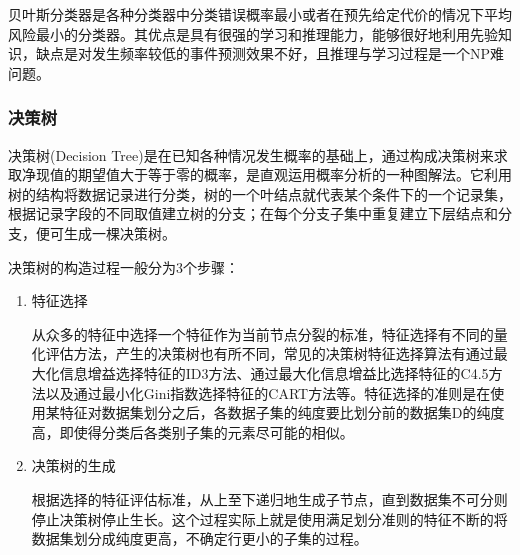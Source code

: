 \documentclass[a4paper]{ctexart}
\begin{document}
贝叶斯分类器是各种分类器中分类错误概率最小或者在预先给定代价的情况下平均风险最小的分类器。其优点是具有很强的学习和推理能力，能够很好地利用先验知识，缺点是对发生频率较低的事件预测效果不好，且推理与学习过程是一个NP难问题。

\subsubsection{决策树}
决策树(Decision Tree)是在已知各种情况发生概率的基础上，通过构成决策树来求取净现值的期望值大于等于零的概率，是直观运用概率分析的一种图解法。它利用树的结构将数据记录进行分类，树的一个叶结点就代表某个条件下的一个记录集，根据记录字段的不同取值建立树的分支；在每个分支子集中重复建立下层结点和分支，便可生成一棵决策树\cite{RN195}。

决策树的构造过程一般分为3个步骤：
\begin{enumerate}
	\item 特征选择

	      从众多的特征中选择一个特征作为当前节点分裂的标准，特征选择有不同的量化评估方法，产生的决策树也有所不同，常见的决策树特征选择算法有通过最大化信息增益选择特征的ID3方法\cite{quinlan1986induction}、通过最大化信息增益比选择特征的C4.5方法\cite{quinlan2014c4}以及通过最小化Gini指数选择特征的CART方法\cite{breiman2017classification}等。特征选择的准则是在使用某特征对数据集划分之后，各数据子集的纯度要比划分前的数据集D的纯度高，即使得分类后各类别子集的元素尽可能的相似。

	\item 决策树的生成

	      根据选择的特征评估标准，从上至下递归地生成子节点，直到数据集不可分则停止决策树停止生长。这个过程实际上就是使用满足划分准则的特征不断的将数据集划分成纯度更高，不确定行更小的子集的过程。


\end{enumerate}
\end{document}

